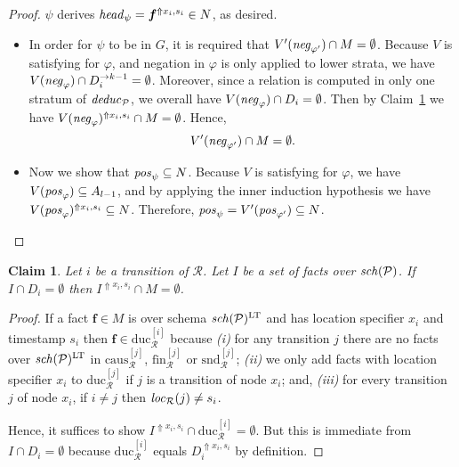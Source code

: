 \documentclass{tlp}
\newtheorem{claim}[theorem]{Claim}
\newcommand{\ded}{\mathcal{P}}
\newcommand{\fc}{\boldsymbol{f}}
\newcommand{\rl}{\varphi}
\newcommand{\head}[1]{\fname{head}_{#1}}
\newcommand{\bpos}[1]{\fname{pos}_{#1}}
\newcommand{\bneg}[1]{\fname{neg}_{#1}}
\newcommand{\schof}[1]{\fname{sch}(#1)}
\newcommand{\grl}{\psi}
\newcommand{\toloct}[1]{#1^{\mathrm{LT}}}
\newcommand{\addlt}[3]{#1^{\Uparrow#2,#3}}
\newcommand{\run}{\mathcal{R}}
\newcommand{\deduc}[1]{\fname{deduc}_{#1}}
\newcommand{\locR}[1]{\fname{loc}_{\run}(#1)}
\newcommand{\slicefin}[1]{\text{fin}_{\run}^{[#1]}}
\newcommand{\sliceduc}[1]{\text{duc}_{\run}^{[#1]}}
\newcommand{\slicesnd}[1]{\text{snd}_{\run}^{[#1]}}
\newcommand{\slicecaus}[1]{\text{caus}_{\run}^{[#1]}}
\newcommand{\grded}{G}
\begin{document}
\begin{appendix}
\begin{proof}
$\grl$ derives $\head{\grl}=\addlt{\fc}{x_{i}}{s_{i}}\in N$, as
desired.
\begin{itemize}
\item In order for $\grl$ to be in $\grded$, it is required that $V'(\bneg{\rl'})\cap M=\emptyset$.
Because $V$ is satisfying for $\rl$, and negation in $\rl$ is only
applied to lower strata, we have $V(\bneg{\rl})\cap\strat{D_{i}}{k-1}=\emptyset$.
Moreover, since a relation is computed in only one stratum of $\deduc{\ded}$,
we overall have $V(\bneg{\rl})\cap D_{i}=\emptyset$. Then by Claim~\ref{claim:not-in-duc-not-in-M}
we have $\addlt{V(\bneg{\rl})}{x_{i}}{s_{i}}\cap M=\emptyset$. Hence,
\[
V'(\bneg{\rl'})\cap M=\emptyset.
\]

\item Now we show that $\bpos{\grl}\subseteq N$. Because $V$ is satisfying
for $\rl$, we have $V(\bpos{\rl})\subseteq A_{l-1}$, and by applying
the inner induction hypothesis we have $\addlt{V(\bpos{\rl})}{x_{i}}{s_{i}}\subseteq N$.
Therefore, $\bpos{\grl}=V'(\bpos{\rl'})\subseteq N$.
\end{itemize}
\end{proof}



\tline



\begin{claim}\label{claim:not-in-duc-not-in-M}Let $i$ be a transition
of $\run$. Let $I$ be a set of facts over $\schof{\ded}$. If $I\cap D_{i}=\emptyset$
then $\addlt I{x_{i}}{s_{i}}\cap M=\emptyset$.\end{claim}

\begin{proof} If a fact $\fc\in M$ is over schema $\toloct{\schof{\ded}}$
and has location specifier $x_{i}$ and timestamp $s_{i}$ then $\fc\in\sliceduc i$
because \emph{(i)} for any transition $j$ there are no facts over
$\toloct{\schof{\ded}}$ in $\slicecaus j$, $\slicefin j$ or $\slicesnd j$;
\emph{(ii)} we only add facts with location specifier $x_{i}$ to
$\sliceduc j$ if $j$ is a transition of node $x_{i}$; and, \emph{(iii)}
for every transition $j$ of node $x_{i}$, if $i\neq j$ then $\locR j\neq s_{i}$.

Hence, it suffices to show $\addlt I{x_{i}}{s_{i}}\cap\sliceduc i=\emptyset$.
But this is immediate from $I\cap D_{i}=\emptyset$ because $\sliceduc i$
equals $\addlt{D_{i}}{x_{i}}{s_{i}}$ by definition.\end{proof}




\end{appendix}
\end{document}
